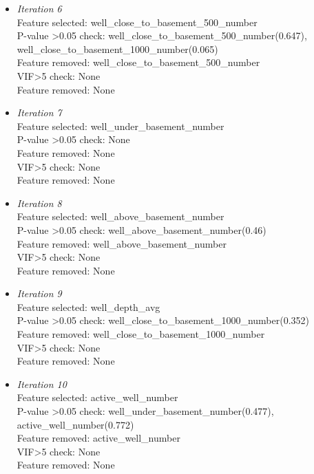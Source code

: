 \documentclass[final-report]{report-template}
\begin{document}
\begin{itemize}
    \item \textit{Iteration 6}\\
    Feature selected: well\_close\_to\_basement\_500\_number\\
    P-value \textgreater 0.05 check: well\_close\_to\_basement\_500\_number(0.647), well\_close\_to\_basement\_1000\_number(0.065)\\
    Feature removed: well\_close\_to\_basement\_500\_number\\
    VIF\textgreater 5 check: None\\
    Feature removed: None\\
    
    
    \item \textit{Iteration 7}\\
    Feature selected: well\_under\_basement\_number\\
    P-value \textgreater 0.05 check: None\\
    Feature removed: None\\
    VIF\textgreater 5 check: None\\
    Feature removed: None\\
    
    \item \textit{Iteration 8}\\
    Feature selected: well\_above\_basement\_number\\
    P-value \textgreater 0.05 check: well\_above\_basement\_number(0.46)\\
    Feature removed: well\_above\_basement\_number\\
    VIF\textgreater 5 check: None\\
    Feature removed: None\\
    
    \item \textit{Iteration 9}\\
    Feature selected: well\_depth\_avg\\
    P-value \textgreater 0.05 check: well\_close\_to\_basement\_1000\_number(0.352)\\
    Feature removed: well\_close\_to\_basement\_1000\_number\\
    VIF\textgreater 5 check: None\\
    Feature removed: None\\
    
    \item \textit{Iteration 10}\\
    Feature selected: active\_well\_number\\
    P-value \textgreater 0.05 check:  well\_under\_basement\_number(0.477), active\_well\_number(0.772)\\
    Feature removed: active\_well\_number\\
    VIF\textgreater 5 check: None\\
    Feature removed: None\\
    

\end{itemize}
\end{document}
